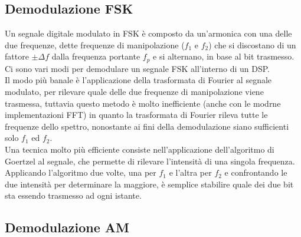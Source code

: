 \documentclass{article}
\begin{document}
\subsection{Demodulazione FSK}
Un segnale digitale modulato in FSK è composto da un'armonica con una delle due frequenze, dette frequenze di manipolazione
($f_1$ e $f_2$) che si discostano di un fattore $\pm \Delta f$ dalla frequenza portante $f_p$ e si alternano, in base al bit
trasmesso. Ci sono vari modi per demodulare un segnale FSK all'interno di un DSP.\\
Il modo più banale è l'applicazione della trasformata di Fourier al segnale modulato, per rilevare quale delle due frequenze
di manipolazione viene trasmessa, tuttavia questo metodo è molto inefficiente (anche con le modrne implementazioni FFT) in quanto
la trasformata di Fourier rileva tutte le frequenze dello spettro, nonostante ai fini della demodulazione siano sufficienti
solo $f_1$ ed $f_2$.\\
Una tecnica molto più efficiente consiste nell'applicazione dell'algoritmo di Goertzel al segnale, che permette di rilevare
l'intensità di una singola frequenza. Applicando l'algoritmo due volte, una per $f_1$ e l'altra per $f_2$ e confrontando le due
intensità per determinare la maggiore, è semplice stabilire quale dei due bit sta essendo trasmesso ad ogni istante.

\subsection{Demodulazione AM}
\end{document}
